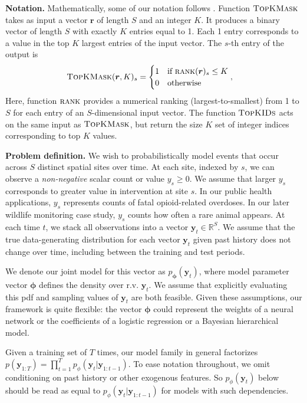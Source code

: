 \textbf{Notation.}
Mathematically, some of our notation follows \citet{sander_fast_2023}. Function $\textsc{TopKMask}$ takes as input a vector $\bm{r}$ of length $S$ and an integer $K$. It produces a binary vector of length $S$ with exactly $K$ entries equal to 1. Each 1 entry corresponds to a value in the top $K$ largest entries of the input vector.
The $s$-th entry of the output is
\begin{align}
\textsc{TopKMask}(\bm{r}, K)_s 
  &= \begin{cases}
  1 & \text{if } \textsc{rank}(\bm{r})_s \leq K\\
  0 & \text{otherwise} 
\end{cases},
\end{align}
Here, function $\textsc{rank}$ provides a numerical ranking (largest-to-smallest) from 1 to $S$ for each entry of an $S$-dimensional input vector. 
The function $\textsc{TopKIDs}$ acts on the same input as $\textsc{TopKMask}$, but return the size $K$ set of integer indices corresponding to top $K$ values.

\textbf{Problem definition.}
We wish to probabilistically model events that occur across $S$ distinct spatial sites over time.
At each site, indexed by $s$, we can observe a \emph{non-negative} scalar count or value $y_s \geq 0$. We assume that larger $y_s$ corresponds to greater value in intervention at site $s$.
In our public health applications, $y_s$ represents counts of fatal opioid-related overdoses.
In our later wildlife monitoring case study, $y_s$ counts how often a rare animal appears.
At each time $t$, we stack all observations into a vector $\bm{y}_t \in \mathbb{R}^S$.
We assume that the true data-generating distribution for each vector $\bm{y}_t$ given past history does not change over time, including between the training and test periods. 

We denote our joint model for this vector as $p_{\bm{\phi}}(\bm{y}_t)$, where model parameter vector $\bm{\phi}$ defines the density over r.v. $\bm{y}_t$. 
We assume that explicitly evaluating this pdf and sampling values of $\bm{y}_t$ are both feasible. Given these assumptions, our framework is quite flexible: the vector $\bm{\phi}$ could represent the weights of a neural network or the coefficients of a logistic regression or a Bayesian hierarchical model. 

 
Given a training set of $T$ times, our model family in general factorizes $p( \bm{y}_{1:T} ) = \prod_{t=1}^T p_{\phi}( \bm{y}_t | \bm{y}_{1:t-1} )$. To ease notation throughout, we omit conditioning on past history or other exogenous features. So $p_{\phi}( \bm{y}_t )$ below should be read as equal to $p_{\phi}( \bm{y}_t | \bm{y}_{1:t-1} )$ for models with such dependencies.


